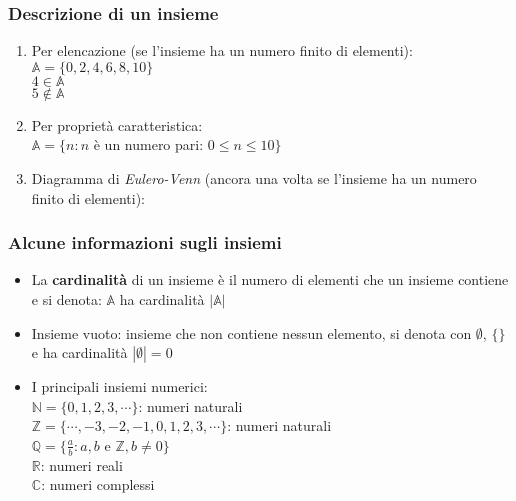 \documentclass{article}
\newcommand{\R}{\mathbb{R}}
\begin{document}
\subsubsection*{Descrizione di un insieme}
\begin{enumerate}
	\item Per elencazione (se l'insieme ha un numero finito di elementi):\\
	      $\mathbb{A}=\{0,2,4,6,8,10\}$\\
	      $4\in\mathbb{A}$\\
	      $5\notin\mathbb{A}$
	\item Per proprietà caratteristica:\\
	      $\mathbb{A}=\{n:n$ è un numero pari: $0\le n\le10\}$
	\item Diagramma di \textit{Eulero-Venn} (ancora una volta se l'insieme ha un numero finito di elementi):
\end{enumerate}
\subsubsection*{Alcune informazioni sugli insiemi}
\begin{itemize}
	\item La \textbf{cardinalità} di un insieme è il numero di elementi che un insieme contiene e si denota: $\mathbb{A}$ ha cardinalità $|\mathbb{A}|$
	\item Insieme vuoto: insieme che non contiene nessun elemento, si denota con $\emptyset$, $\{\}$ e ha cardinalità $|\emptyset|=0$
	\item I principali insiemi numerici:\\
	      $\mathbb{N}=\{0,1,2,3,\cdots\}$: numeri naturali\\
	      $\mathbb{Z}=\{\cdots,-3,-2,-1,0,1,2,3,\cdots\}$: numeri naturali\\
	      $\mathbb{Q}=\{\frac{a}{b}:a,b$ e $\mathbb{Z},b\not=0\}$\\
	      $\R$: numeri reali\\
	      $\mathbb{C}$: numeri complessi
\end{itemize}
\end{document}
